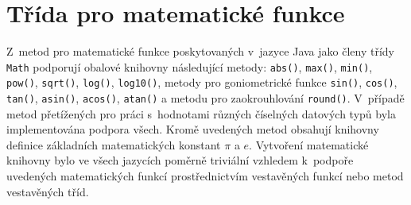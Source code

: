 \documentclass[czech,BP]{thesiskiv}
\begin{document}
\section{Třída pro matematické funkce}
Z~metod pro matematické funkce poskytovaných v~jazyce Java jako členy třídy \texttt{Math} podporují obalové knihovny následující metody: \texttt{abs()}, \texttt{max()}, \texttt{min()}, \texttt{pow()}, \texttt{sqrt()}, \texttt{log()}, \texttt{log10()}, metody pro goniometrické funkce \texttt{sin()}, \texttt{cos()}, \texttt{tan()}, \texttt{asin()}, \texttt{acos()}, \texttt{atan()} a metodu pro zaokrouhlování \texttt{round()}. V~případě metod přetížených pro práci s~hodnotami různých číselných datových typů byla implementována podpora všech. Kromě uvedených metod obsahují knihovny definice základních matematických konstant $\pi$ a $e$. Vytvoření matematické knihovny bylo ve všech jazycích poměrně triviální vzhledem k~podpoře uvedených matematických funkcí prostřednictvím vestavěných funkcí nebo metod vestavěných tříd.
\end{document}
